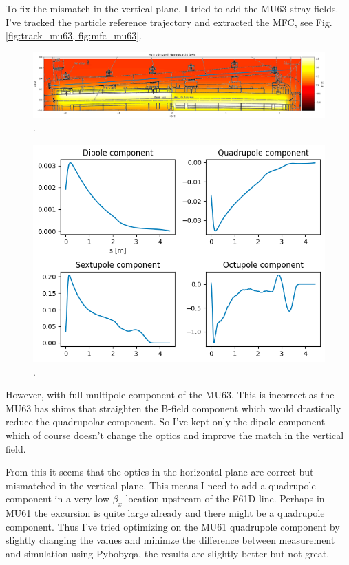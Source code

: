 To fix the mismatch in the vertical plane, I tried to add the MU63 stray fields. I've tracked the particle reference trajectory and extracted the MFC, see Fig. \ref{fig:track_mu63, fig:mfc_mu63}.

\begin{figure}[H]
\centering
\includegraphics[width=1.0\textwidth]{02_Simulation/images/track_mu63.png}
\caption{.}
\label{fig:track_mu63}
\end{figure}

\begin{figure}[H]
\centering
\includegraphics[width=1.0\textwidth]{02_Simulation/images/mfc_mu63.png}
\caption{.}
\label{fig:mfc_mu63}
\end{figure}

However, with full multipole component of the MU63. This is incorrect as the MU63 has shims that straighten the B-field component which would drastically reduce the quadrupolar component. So I've kept only the dipole component which of course doesn't change the optics and improve the match in the vertical field.

From this it seems that the optics in the horizontal plane are correct but mismatched in the vertical plane. This means I need to add a quadrupole component in a very low $\beta_{x}$ location upstream of the F61D line. Perhaps in MU61 the excursion is quite large already and there might be a quadrupole component. Thus I've tried optimizing on the MU61 quadrupole component by slightly changing the values and minimze the difference between measurement and simulation using Pybobyqa, the results are slightly better but not great.

